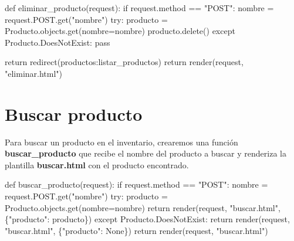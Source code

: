 \documentclass[
  a4paper,
  DIV=11,
  numbers=noendperiod,
  onepage,
  openany]{scrreprt}
\newenvironment{Shaded}{\begin{snugshade}}{\end{snugshade}}
\newcommand{\ControlFlowTok}[1]{\textcolor[rgb]{0.00,0.23,0.31}{#1}}
\newcommand{\KeywordTok}[1]{\textcolor[rgb]{0.00,0.23,0.31}{#1}}
\newcommand{\NormalTok}[1]{\textcolor[rgb]{0.00,0.23,0.31}{#1}}
\newcommand{\OperatorTok}[1]{\textcolor[rgb]{0.37,0.37,0.37}{#1}}
\newcommand{\StringTok}[1]{\textcolor[rgb]{0.13,0.47,0.30}{#1}}
\newcommand{\VariableTok}[1]{\textcolor[rgb]{0.07,0.07,0.07}{#1}}
\begin{document}
\begin{Shaded}
\begin{Highlighting}[]
\KeywordTok{def}\NormalTok{ eliminar\_producto(request):}
    \ControlFlowTok{if}\NormalTok{ request.method }\OperatorTok{==} \StringTok{"POST"}\NormalTok{:}
\NormalTok{        nombre }\OperatorTok{=}\NormalTok{ request.POST.get(}\StringTok{"nombre"}\NormalTok{)}
        \ControlFlowTok{try}\NormalTok{:}
\NormalTok{            producto }\OperatorTok{=}\NormalTok{ Producto.objects.get(nombre}\OperatorTok{=}\NormalTok{nombre)}
\NormalTok{            producto.delete()}
        \ControlFlowTok{except}\NormalTok{ Producto.DoesNotExist:}
            \ControlFlowTok{pass}
        
        \ControlFlowTok{return}\NormalTok{ redirect(}\StringTok{\textquotesingle{}productos:listar\_productos\textquotesingle{}}\NormalTok{)}
    \ControlFlowTok{return}\NormalTok{ render(request, }\StringTok{"eliminar.html"}\NormalTok{)}
\end{Highlighting}
\end{Shaded}

\section{Buscar producto}\label{buscar-producto}

Para buscar un producto en el inventario, crearemos una función
\textbf{buscar\_producto} que recibe el nombre del producto a buscar y
renderiza la plantilla \textbf{buscar.html} con el producto encontrado.

\begin{Shaded}
\begin{Highlighting}[]
\KeywordTok{def}\NormalTok{ buscar\_producto(request):}
    \ControlFlowTok{if}\NormalTok{ request.method }\OperatorTok{==} \StringTok{"POST"}\NormalTok{:}
\NormalTok{        nombre }\OperatorTok{=}\NormalTok{ request.POST.get(}\StringTok{"nombre"}\NormalTok{)}
        \ControlFlowTok{try}\NormalTok{:}
\NormalTok{            producto }\OperatorTok{=}\NormalTok{ Producto.objects.get(nombre}\OperatorTok{=}\NormalTok{nombre)}
            \ControlFlowTok{return}\NormalTok{ render(request, }\StringTok{"buscar.html"}\NormalTok{, \{}\StringTok{"producto"}\NormalTok{: producto\})}
        \ControlFlowTok{except}\NormalTok{ Producto.DoesNotExist:}
            \ControlFlowTok{return}\NormalTok{ render(request, }\StringTok{"buscar.html"}\NormalTok{, \{}\StringTok{"producto"}\NormalTok{: }\VariableTok{None}\NormalTok{\})}
    \ControlFlowTok{return}\NormalTok{ render(request, }\StringTok{"buscar.html"}\NormalTok{)}
\end{Highlighting}
\end{Shaded}
\end{document}

